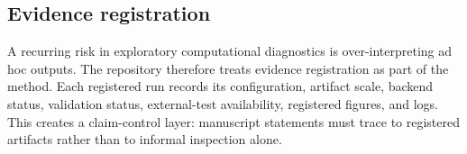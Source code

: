 \subsection{Evidence registration}
\label{subsec:evidence-registration-background}

A recurring risk in exploratory computational diagnostics is over-interpreting ad hoc outputs. The repository therefore treats evidence registration as part of the method. Each registered run records its configuration, artifact scale, backend status, validation status, external-test availability, registered figures, and logs. This creates a claim-control layer: manuscript statements must trace to registered artifacts rather than to informal inspection alone.
